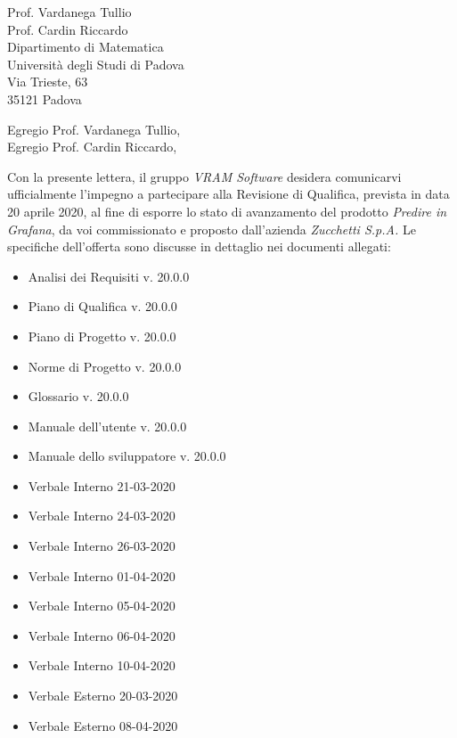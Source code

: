 \documentclass[a4paper,12pt]{letteracdp}
\date{13 aprile 2020}
\begin{document}
\begin{letter}{
		Prof. Vardanega Tullio \\
		Prof. Cardin Riccardo \\
		Dipartimento di Matematica \\
		Università degli Studi di Padova \\
		Via Trieste, 63 \\
		35121 Padova}
	
	\opening{Egregio Prof. Vardanega Tullio, \\ \noindent Egregio Prof. Cardin Riccardo,}
	
	\begin{flushleft}
	Con la presente lettera, il gruppo \textit{VRAM Software} desidera comunicarvi ufficialmente l'impegno a partecipare alla Revisione di Qualifica, prevista in data 20 aprile 2020, al fine di esporre lo stato di avanzamento del prodotto \textit{Predire in Grafana}, da voi commissionato e proposto dall'azienda \textit{Zucchetti S.p.A.}
	Le specifiche dell'offerta sono discusse in dettaglio nei documenti allegati: \\ 
	\end{flushleft}

	\begin{itemize}
		\item Analisi dei Requisiti v. 20.0.0
		\item Piano di Qualifica v. 20.0.0
		\item Piano di Progetto v. 20.0.0
		\item Norme di Progetto v. 20.0.0
		\item Glossario v. 20.0.0
		
		\item Manuale dell'utente v. 20.0.0
		\item Manuale dello sviluppatore v. 20.0.0
		
		\item Verbale Interno 21-03-2020 
		\item Verbale Interno 24-03-2020 
		\item Verbale Interno 26-03-2020 
		\item Verbale Interno 01-04-2020 
		\item Verbale Interno 05-04-2020 
		\item Verbale Interno 06-04-2020 
		\item Verbale Interno 10-04-2020 
		
		\item Verbale Esterno 20-03-2020 
		\item Verbale Esterno 08-04-2020 
	\end{itemize}



\end{letter}
\end{document}
